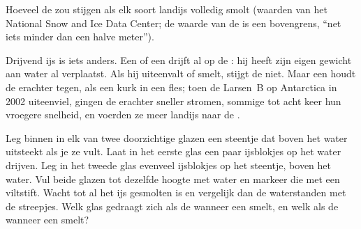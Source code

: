 \begin{omfigure}

{\small Hoeveel de  zou stijgen als elk soort landijs volledig smolt
(waarden van het National Snow and Ice Data Center; de waarde van de
 is een bovengrens, ``net iets minder dan een halve meter'').}
\label{fig:g8:ice-on-earth:sea-level-bars}
\end{omfigure}

Drijvend ijs is iets anders. Een  of een  drijft al op de
: hij heeft zijn eigen gewicht aan water al verplaatst. Als hij
uiteenvalt of smelt, stijgt de  niet. Maar een  houdt de
 erachter tegen, als een kurk in een fles; toen de 
Larsen~B op Antarctica in 2002 uiteenviel, gingen de  erachter
sneller stromen, sommige tot acht keer hun vroegere snelheid, en voerden
ze meer landijs naar de .

\begin{inthelab}
Leg binnen in elk van twee doorzichtige glazen een steentje dat boven het
water uitsteekt als je ze vult. Laat in het eerste glas een paar ijsblokjes
op het water drijven. Leg in het tweede glas evenveel ijsblokjes op het
steentje, boven het water. Vul beide glazen tot dezelfde hoogte met water
en markeer die met een viltstift. Wacht tot al het ijs gesmolten is en
vergelijk dan de waterstanden met de streepjes. Welk glas gedraagt zich
als de  wanneer een  smelt, en welk als de  wanneer een 
smelt?
\end{inthelab}

